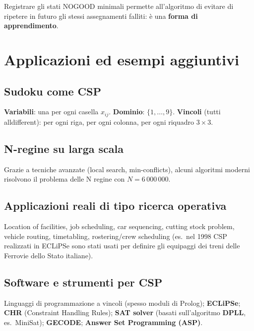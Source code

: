 \documentclass[11pt,a4paper]{report}
\begin{document}
Registrare gli stati NOGOOD minimali permette all'algoritmo di evitare di ripetere in futuro gli stessi assegnamenti falliti: è una \textbf{forma di apprendimento}.

\section{Applicazioni ed esempi aggiuntivi}

\subsection*{Sudoku come CSP}

\textbf{Variabili}: una per ogni casella $x_{ij}$. \textbf{Dominio}: $\{1,\dots,9\}$. \textbf{Vincoli} (tutti alldifferent): per ogni riga, per ogni colonna, per ogni riquadro $3\times 3$.

\subsection*{N-regine su larga scala}

Grazie a tecniche avanzate (local search, min-conflicts), alcuni algoritmi moderni risolvono il problema delle N regine con $N=6\,000\,000$.

\subsection*{Applicazioni reali di tipo ricerca operativa}

Location of facilities, job scheduling, car sequencing, cutting stock problem, vehicle routing, timetabling, rostering/crew scheduling (es.\ nel 1998 CSP realizzati in ECLiPSe sono stati usati per definire gli equipaggi dei treni delle Ferrovie dello Stato italiane).

\subsection*{Software e strumenti per CSP}

Linguaggi di programmazione a vincoli (spesso moduli di Prolog); \textbf{ECLiPSe}; \textbf{CHR} (Constraint Handling Rules); \textbf{SAT solver} (basati sull'algoritmo \textbf{DPLL}, es.\ MiniSat); \textbf{GECODE}; \textbf{Answer Set Programming (ASP)}.
\end{document}
